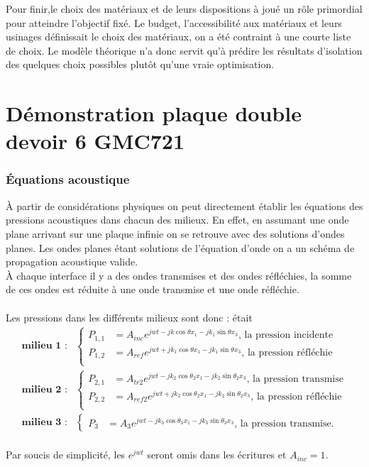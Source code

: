 \documentclass[12pt,foolscap]{report}
\begin{document}
	Pour finir,le choix des matériaux et de leurs dispositions à joué un rôle primordial pour atteindre l'objectif fixé. Le budget, l'accessibilité aux matériaux et leurs usinages définissait le choix des matériaux, on a été contraint à une courte liste de choix. Le modèle théorique n'a donc servit qu'à prédire les résultats d'isolation des quelques choix possibles plutôt qu'une vraie optimisation.\\
	
	\printbibliography
	\appendix
	\chapter{Démonstration plaque double devoir 6 GMC721}
	\label{ch:demodev6}
	\subsection*{Équations acoustique}
	À partir de considérations physiques on peut directement établir les équations des pressions acoustiques dans chacun des milieux. En effet, en assumant une onde plane arrivant sur une plaque infinie on se retrouve avec des solutions d'ondes planes. Les ondes planes étant solutions de l'équation d'onde on a un schéma de propagation acoustique valide.\\ 
	À chaque interface il y a des ondes transmises et des ondes réfléchies, la somme de ces ondes est réduite à une onde transmise et une onde réfléchie.\\ \\
	Les pressions dans les différents milieux sont donc : était
	\begin{align}
	\textbf{milieu 1 :} &
	\begin{cases}
	P_{1,1} &= A_{inc}e^{jwt-jk\cos\theta x_1-jk_1\sin\theta x_3} \text{, la pression incidente}\\
	P_{1,2} &= A_{ref}e^{jwt+jk_1\cos\theta x_1-jk_1\sin\theta x_3}\text{, la pression réfléchie}\\
	\end{cases}\\
	\textbf{milieu 2 :} &
	\begin{cases}
	P_{2,1} &= A_{tr2}e^{jwt-jk_2\cos\theta_2 x_1-jk_2\sin\theta_2 x_3} \text{, la pression transmise}\\
	P_{2,2} &= A_{ref2}e^{jwt+jk_2\cos\theta_2 x_1-jk_2\sin\theta_2 x_3}\text{, la pression réfléchie}\\
	\end{cases}\\
	\textbf{milieu 3 :} &
	\begin{cases}
	P_{3} &= A_{3}e^{jwt-jk_3\cos\theta_3 x_1-jk_3\sin\theta_3 x_3} \text{, la pression transmise.}
	\end{cases}
	\end{align}\\
	Par soucis de simplicité, les $e^{jwt}$ seront omis dans les écritures et $A_{inc}=1$.
\end{document}
